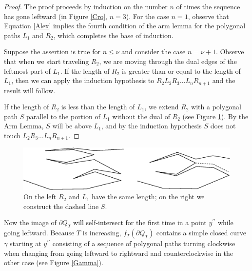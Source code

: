 \documentclass{article}
\theoremstyle{theorem}
\begin{document}
\begin{proof}
The proof proceeds by induction on the number $n$ of times the sequence has gone leftward (in Figure \ref{Cro}, $n=3$). For the case $n=1$, observe that Equation \ref{Alex} implies the fourth condition of the arm lemma for the polygonal paths $L_1$ and $R_2$, which completes the base of induction.

Suppose the assertion is true for $n \leq \nu$ and consider the case $n=\nu +1$. %
Observe that when we start traveling $R_2$, we are moving through the dual edges of the leftmost part of $L_1$. If the length of $R_2$ is greater than or equal to the length of $L_1$, then  we can apply the induction hypothesis to $R_2L_2R_3 \ldots L_nR_{n+1}$ and the result will follow. 

If the length of $R_2$ is less than the length of $L_1$, we extend $R_2 $ with a polygonal path $S$ parallel to the portion of $L_1$ without the dual of $R_2$ (see Figure \ref{S}). By the Arm Lemma, $S$ will be above $L_1$, and by the induction hypothesis $S$ does not touch $L_2R_3 \ldots L_nR_{n+1}$.
\end{proof}




\begin{figure}[h]
\centering
\includegraphics[scale=0.58]{S.eps}
\caption{On the left $R_2$ and $L_1$ have the same length; on the right we construct the dashed line $S$.} \label{S}
\end{figure}




Now the image of $\partial  Q_T$ will self-intersect for the first time in a point $y^{\prime\prime}$ while going leftward. Because $T$ is increasing, $f_T(\partial Q_T)$ contains a simple closed curve $\gamma$ starting at $y^{\prime \prime}$ consisting of a sequence of polygonal paths turning clockwise when changing from going leftward to rightward and counterclockwise in the other case (see Figure \ref{Gamma}).
\end{document}
